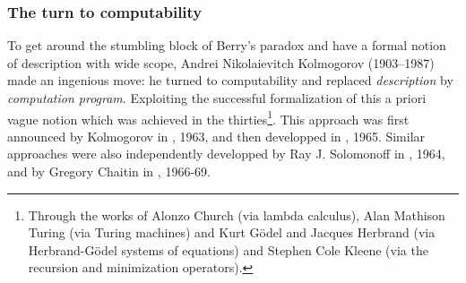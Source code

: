 \subsubsection{The turn to computability}\label{sss:turn}
To get around the stumbling block of Berry's paradox
and have a formal notion of description with wide scope,
Andrei Nikolaievitch Kolmogorov (1903--1987) made an
ingenious move: he turned to computability and
replaced {\em description} by {\em computation program}.
Exploiting the successful formalization of this a priori
vague notion which was achieved in the thirties\footnote{
Through the works of Alonzo Church (via lambda calculus),
Alan Mathison Turing (via Turing machines)
and Kurt G\"odel and Jacques Herbrand (via Herbrand-G\"odel
systems of equations)
and Stephen Cole Kleene (via the recursion and minimization
operators).}.
This approach was first announced by Kolmogorov in
\cite{kolmo63}, 1963,
and then developped in \cite{kolmo65}, 1965.
Similar approaches were also independently developped by
Ray J. Solomonoff in \cite{solo64a,solo64b}, 1964,
and by Gregory Chaitin in \cite{chaitin66, chaitin69}, 1966-69.
